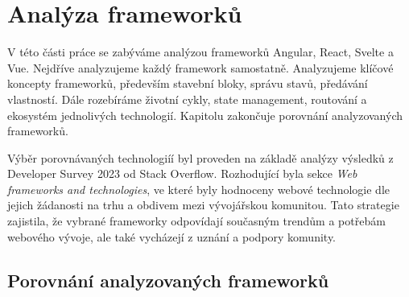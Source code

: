 \section{Analýza frameworků}

V této části práce se zabýváme analýzou frameworků Angular, React, Svelte a Vue. Nejdříve analyzujeme každý framework samostatně. 
Analyzujeme klíčové koncepty frameworků, především stavební bloky, správu stavů, předávání vlastností. 
Dále rozebíráme životní cykly, state management, routování a ekosystém jednolivých technologií. 
Kapitolu zakončuje porovnání analyzovaných frameworků.

Výběr porovnávaných technologiíí byl proveden na základě analýzy výsledků z Developer Survey 2023 od Stack Overflow. 
Rozhodující byla sekce \emph{Web frameworks and technologies}, ve které byly hodnoceny webové technologie dle jejich žádanosti na trhu a obdivem mezi vývojářskou komunitou. 
Tato strategie zajistila, že vybrané frameworky odpovídají současným trendům a potřebám webového vývoje, ale také vycházejí z uznání a podpory komunity.\cite{stackoverflow, developersurvey}







\subsection{Porovnání analyzovaných frameworků}

